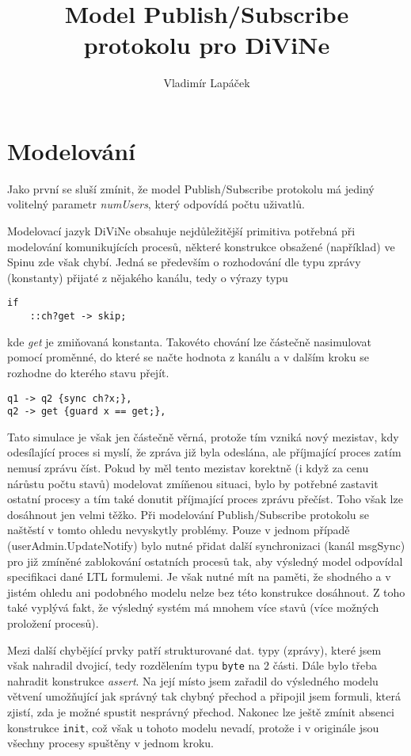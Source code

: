 \documentclass[a4paper]{article}
\author{Vladimír Lapáček}
\title{Model Publish/Subscribe protokolu pro DiViNe}
\begin{document}
\section{Modelování}
Jako první se sluší zmínit, že model Publish/Subscribe protokolu má jediný volitelný parametr \emph{numUsers}, který odpovídá počtu uživatlů.

Modelovací jazyk DiViNe obsahuje nejdůležitější primitiva potřebná při modelování komunikujících procesů, některé konstrukce obsažené
(například) ve Spinu zde však chybí. Jedná se především o rozhodování dle typu zprávy (konstanty) přijaté z nějakého kanálu, tedy
o výrazy typu
\begin{verbatim}
if
    ::ch?get -> skip;
\end{verbatim}
kde \emph{get} je zmiňovaná konstanta. Takovéto chování lze částečně nasimulovat pomocí proměnné, do které se načte hodnota z kanálu
a v dalším kroku se rozhodne do kterého stavu přejít.
\begin{verbatim}
q1 -> q2 {sync ch?x;},
q2 -> get {guard x == get;},
\end{verbatim}
Tato simulace je však jen částečně věrná, protože tím vzniká nový mezistav, kdy
odesílající proces si myslí, že zpráva již byla odeslána, ale příjmající proces zatím nemusí zprávu číst. Pokud by měl tento mezistav
korektně (i když za cenu nárůstu počtu stavů) modelovat zmíňenou situaci, bylo by potřebné zastavit ostatní procesy a tím také donutit
příjmající proces zprávu přečíst. Toho však lze dosáhnout jen velmi těžko. Při modelování Publish/Subscribe protokolu se naštěstí v tomto
ohledu nevyskytly problémy. Pouze v jednom případě (userAdmin.UpdateNotify) bylo nutné přidat další synchronizaci (kanál msgSync) pro již
zmíněné
zablokování ostatních procesů tak, aby výsledný model odpovídal specifikaci dané LTL formulemi. Je však nutné mít na paměti, že shodného
a v jistém ohledu ani podobného modelu nelze bez této konstrukce dosáhnout. Z toho také vyplývá fakt, že výsledný systém má mnohem více stavů
(více možných proložení procesů).

Mezi další chybějící prvky patří strukturované dat. typy (zprávy), které jsem však nahradil dvojicí, tedy rozdělením typu \texttt{byte}
na 2 části. Dále bylo třeba nahradit konstrukce \emph{assert}. Na její místo jsem zařadil do výsledného
modelu větvení umožňující jak správný tak chybný přechod a připojil jsem formuli, která zjistí, zda je možné spustit nesprávný přechod.
Nakonec
lze ještě zmínit absenci konstrukce \texttt{init}, což však u tohoto modelu nevadí, protože i v originále jsou všechny procesy spuštěny
v jednom kroku.
\end{document}
